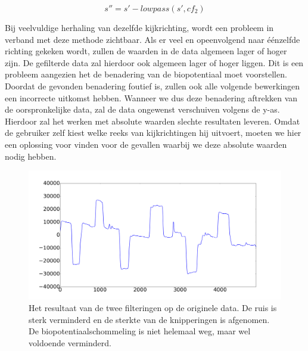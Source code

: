 \documentclass{article}
\begin{document}
\begin{equation}
\label{eq:aftrekkingbiopotentiaal}
s'' = s' - lowpass(s', cf_2)
\end{equation}

Bij veelvuldige herhaling van dezelfde kijkrichting, wordt een probleem in verband met deze methode zichtbaar. Als er veel en opeenvolgend naar éénzelfde richting gekeken wordt, zullen de waarden in de data algemeen lager of hoger zijn. De gefilterde data zal hierdoor ook algemeen lager of hoger liggen. Dit is een probleem aangezien het de benadering van de biopotentiaal moet voorstellen. Doordat de gevonden benadering foutief is, zullen ook alle volgende bewerkingen een incorrecte uitkomst hebben. Wanneer we dus deze benadering aftrekken van de oorspronkelijke data, zal de data ongewenst verschuiven volgens de y-as. Hierdoor zal het werken met absolute waarden slechte resultaten leveren. Omdat de gebruiker zelf kiest welke reeks van kijkrichtingen hij uitvoert, moeten we hier een oplossing voor vinden voor de gevallen waarbij we deze absolute waarden nodig hebben.

\begin{figure}[h]
\centering
\includegraphics[width=\linewidth]{images/filtered_data}
\caption{Het resultaat van de twee filteringen op de originele data. De ruis is sterk verminderd en de sterkte van de knipperingen is afgenomen. De biopotentiaalschommeling is niet helemaal weg, maar wel voldoende verminderd.}
\label{fig:filtereddata}
\end{figure}
\end{document}
